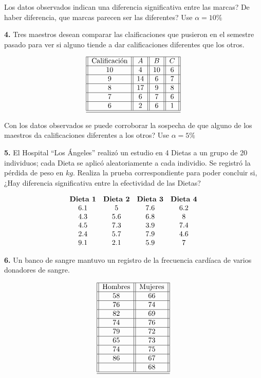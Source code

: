 \documentclass[
  a4paper,
  oneside,
  openany]{book}
\begin{document}
Los datos observados indican una diferencia significativa entre las marcas? De haber diferencia, que marcas parecen ser las diferentes? Use \(\alpha=10\%\)

\textbf{4.} Tres maestros desean comparar las claificaciones que pusieron en el semestre pasado para ver si alguno tiende a dar calificaciones diferentes que los otros.

\[
\begin{array}{||c| |c| |c| |c||} 
\hline 
\mbox{Calificación} & A & B&C \\  
 \hline
10&4&10&6\\
 \hline
9&14&6&7\\
 \hline
8&17&9&8\\
 \hline
7&6&7&6\\
 \hline
6&2&6&1\\
\hline
\hline
\end{array}
\]

Con los datos observados se puede corroborar la sospecha de que alguno de los maestros da calificaciones diferentes a los otros? Use \(\alpha=5\%\)

\textbf{5.} El Hospital ``Los Ángeles'' realizó un estudio en 4 Dietas a un grupo de 20 individuos; cada Dieta se aplicó aleatoriamente a cada individio. Se registró la pérdida de peso en \(kg\).
Realiza la prueba correspondiente para poder concluir si, ¿Hay diferencia significativa entre la efectividad de las Dietas?

\[
\begin{array}{c c c c} 
\textbf{Dieta 1} & \textbf{Dieta 2} & \textbf{Dieta 3} & \textbf{Dieta 4}\\
6.1&5&7.6&6.2\\
4.3&5.6&6.8&8\\
4.5&7.3&3.9&7.4\\
2.4&5.7&7.9&4.6\\
9.1&2.1&5.9&7\\
\end{array}
\]

\textbf{6.} Un banco de sangre mantuvo un registro de la frecuencia cardíaca de varios donadores de sangre.

\[
\begin{array}{||c| |c||} 
\hline 
\mbox{Hombres}& \mbox{Mujeres} \\  
 \hline
58&66\\
 \hline
76&74\\
 \hline
82&69\\
 \hline
74&76\\
 \hline
79&72\\
 \hline
65&73\\
 \hline
74&75\\
 \hline
86&67\\
 \hline
&68\\
 \hline
\hline
\end{array}
\]
\end{document}
